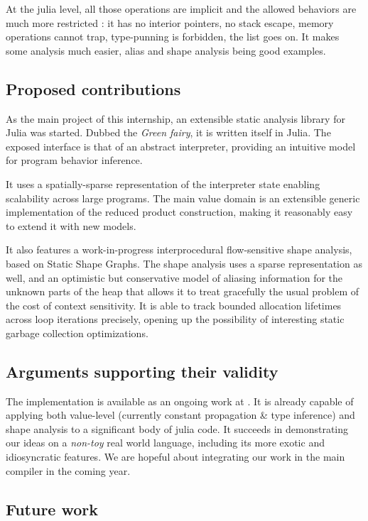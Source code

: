 \documentclass[11pt]{article}
\begin{document}
At the julia level, all those operations are implicit and the allowed behaviors are much more restricted : it has no interior pointers, no stack escape, memory operations cannot trap, type-punning is forbidden, the list goes on. It makes some analysis much easier, alias and shape analysis being good examples.


\subsection*{Proposed contributions}

As the main project of this internship, an extensible static analysis library for Julia was started. Dubbed the \emph{Green fairy}, it is written itself in Julia. The exposed interface is that of an abstract interpreter, providing an intuitive model for program behavior inference.

It uses a spatially-sparse representation of the interpreter state enabling scalability across large programs. The main value domain is an extensible generic implementation of the reduced product construction, making it reasonably easy to extend it with new models.

It also features a work-in-progress interprocedural flow-sensitive shape analysis, based on Static Shape Graphs\cite{ssc}. The shape analysis uses a sparse representation as well, and an optimistic but conservative model of aliasing information for the unknown parts of the heap that allows it to treat gracefully the usual problem of the cost of context sensitivity. It is able to track bounded allocation lifetimes across loop iterations precisely, opening up the possibility of interesting static garbage collection optimizations.

\subsection*{Arguments supporting their validity}

The implementation is available as an ongoing work at \cite{gf-web}. It is already capable of applying both value-level (currently constant propagation \& type inference) and shape analysis to a significant body of julia code.
It succeeds in demonstrating our ideas on a \emph{non-toy} real world language, including its more exotic and idiosyncratic features.
We are hopeful about integrating our work in the main compiler in the coming year.

\subsection*{Future work}
\end{document}
